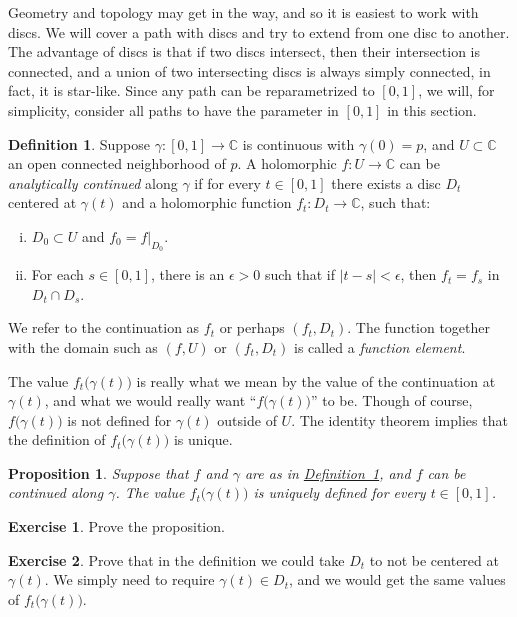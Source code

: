 \documentclass[12pt,openany]{book}
\newcommand{\sabs}[1]{\lvert {#1} \rvert}
\newcommand{\C}{{\mathbb{C}}}
\newcommand{\myindex}[1]{#1\index{#1}}
\newcommand{\myquote}[1]{``#1''}
\theoremstyle{plain}
\newtheorem{prop}[thm]{Proposition}
\theoremstyle{remark}
\theoremstyle{definition}
\newtheorem{defn}[thm]{Definition}
\newenvironment{exbox}{%
    \def\FrameCommand{\vrule width 1pt \relax\hspace{10pt}}%
    \MakeFramed{\advance\hsize-\width\FrameRestore}%
}{%
    \endMakeFramed
}
\theoremstyle{exercise}
\newtheorem{exercise}{Exercise}[section]
\theoremstyle{example}
\newcommand{\defnref}[1]{\hyperref[#1]{Definition~\ref*{#1}}}
\begin{document}
Geometry and topology may get in the way, and so it is easiest
to work with discs.  We will cover a path with discs and try to
extend from one disc to another.  The advantage of discs is that if two
discs intersect, then their intersection is connected, and a union of two
intersecting discs is always simply connected, in fact, it is star-like.
Since any path can be reparametrized to $[0,1]$, we will, for simplicity,
consider all paths to have the parameter in $[0,1]$ in this section.

\begin{defn} \label{defn:analcont}
Suppose $\gamma \colon [0,1] \to \C$ is continuous with $\gamma(0) = p$,
and $U \subset \C$ an open connected neighborhood of $p$.
A holomorphic 
$f \colon U \to \C$
can be
\emph{analytically continued}
along $\gamma$
if for every $t \in [0,1]$ there exists
a disc $D_t$ centered at $\gamma(t)$ and a holomorphic function
$f_t \colon D_t \to \C$, such that:
\begin{enumerate}[(i)]
\item
$D_0 \subset U$ and $f_0 = f|_{D_0}$.
\item
For each $s \in [0,1]$, there is an
$\epsilon > 0$ such that if $\sabs{t-s} < \epsilon$, then
$f_t = f_s$ in $D_t \cap D_s$.
\end{enumerate}
We refer to the continuation as $f_t$ or perhaps $(f_t,D_t)$.
The function together with the domain such as $(f,U)$ or $(f_t,D_t)$
is called a \emph{\myindex{function element}}.
\end{defn}

The value
$f_t\bigl(\gamma(t)\bigr)$ is really what we mean by the value of
the continuation at $\gamma(t)$, and what we would really want
\myquote{$f\bigl(\gamma(t)\bigr)$} to be.
Though of course, $f\bigl(\gamma(t)\bigr)$ is not defined for $\gamma(t)$ outside of
$U$.
The identity theorem implies that the definition of
$f_t\bigl(\gamma(t)\bigr)$ is unique.

\begin{prop}
Suppose that $f$ and $\gamma$ are as in \defnref{defn:analcont},
and
$f$ can be continued along $\gamma$.
The value $f_t\bigl(\gamma(t)\bigr)$ is uniquely
defined for every $t \in [0,1]$.
\end{prop}

\begin{exbox}
\begin{exercise}
Prove the proposition.
\end{exercise}

\begin{exercise}
Prove that in the definition we could take $D_t$ to not be centered at
$\gamma(t)$.  We simply need to require $\gamma(t) \in D_t$, and we would
get the same values of $f_t\bigl(\gamma(t)\bigr)$.
\end{exercise}
\end{exbox}
\end{document}
